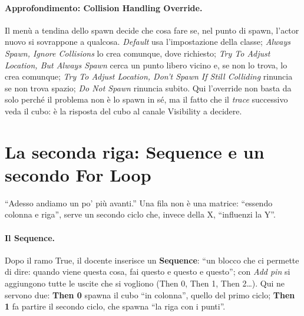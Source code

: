\paragraph{Approfondimento: Collision Handling Override.} Il menù a tendina dello spawn
decide che cosa fare se, nel punto di spawn, l'actor nuovo si sovrappone a qualcosa.
\emph{Default} usa l'impostazione della classe; \emph{Always Spawn, Ignore Collisions}
lo crea comunque, dove richiesto; \emph{Try To Adjust Location, But Always Spawn} cerca
un punto libero vicino e, se non lo trova, lo crea comunque; \emph{Try To Adjust
Location, Don't Spawn If Still Colliding} rinuncia se non trova spazio; \emph{Do Not
Spawn} rinuncia subito. Qui l'override non basta da solo perché il problema non è lo
spawn in sé, ma il fatto che il \emph{trace} successivo veda il cubo: è la risposta del
cubo al canale Visibility a decidere.

\section{La seconda riga: Sequence e un secondo For Loop}
\label{ue6:sec:righe}

``Adesso andiamo un po' più avanti.'' Una fila non è una matrice: ``essendo colonna e
riga'', serve un secondo ciclo che, invece della X, ``influenzi la Y''.

\paragraph{Il Sequence.} Dopo il ramo True, il docente inserisce un \textbf{Sequence}:
``un blocco che ci permette di dire: quando viene questa cosa, fai questo e questo e
questo''; con \emph{Add pin} si aggiungono tutte le uscite che si vogliono (Then 0, Then
1, Then 2\ldots). Qui ne servono due: \textbf{Then 0} spawna il cubo ``in colonna'',
quello del primo ciclo; \textbf{Then 1} fa partire il secondo ciclo, che spawna ``la riga
con i punti''.

